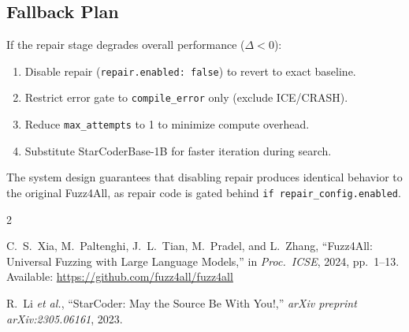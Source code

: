 \documentclass[conference]{IEEEtran}
\begin{document}
\subsection{Fallback Plan}

If the repair stage degrades overall performance ($\Delta < 0$):
\begin{enumerate}
    \item Disable repair (\texttt{repair.enabled: false}) to revert to exact baseline.
    \item Restrict error gate to \texttt{compile\_error} only (exclude ICE/CRASH).
    \item Reduce \texttt{max\_attempts} to 1 to minimize compute overhead.
    \item Substitute StarCoderBase-1B for faster iteration during search.
\end{enumerate}

The system design guarantees that disabling repair produces identical behavior to the original Fuzz4All, as repair code is gated behind \texttt{if repair\_config.enabled}.


\begin{thebibliography}{2}

C.~S.~Xia, M.~Paltenghi, J.~L.~Tian, M.~Pradel, and L.~Zhang, ``Fuzz4All: Universal Fuzzing with Large Language Models,'' in \emph{Proc.\ ICSE}, 2024, pp.~1--13. Available: \url{https://github.com/fuzz4all/fuzz4all}

R.~Li \emph{et al.}, ``StarCoder: May the Source Be With You!,'' \emph{arXiv preprint arXiv:2305.06161}, 2023.

\end{thebibliography}
\end{document}
